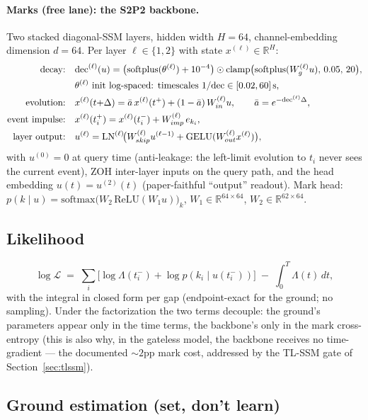\documentclass[11pt]{article}
\begin{document}
\paragraph{Marks (free lane): the S2P2 backbone.} Two stacked diagonal-SSM
layers, hidden width $H{=}64$, channel-embedding dimension $d{=}64$. Per layer
$\ell\in\{1,2\}$ with state $x^{(\ell)}\in\mathbb{R}^{H}$:
\begin{align}
\text{decay:}\quad & \mathrm{dec}^{(\ell)}(u)=\big(\mathrm{softplus}(\theta^{(\ell)})+10^{-4}\big)
\odot \mathrm{clamp}\big(\mathrm{softplus}(W_g^{(\ell)}u),\,0.05,\,20\big),\\
&\theta^{(\ell)} \text{ init log-spaced: timescales } 1/\mathrm{dec} \in [0.02, 60]\,\mathrm{s},\notag\\
\text{evolution:}\quad & x^{(\ell)}(t{+}\Delta)=\bar a\,x^{(\ell)}(t^{+})+(1-\bar a)\,W_{in}^{(\ell)}u,
\qquad \bar a=e^{-\mathrm{dec}^{(\ell)}\Delta},\\
\text{event impulse:}\quad & x^{(\ell)}(t_i^+)=x^{(\ell)}(t_i^-)+W_{imp}^{(\ell)}\,e_{k_i},\\
\text{layer output:}\quad & u^{(\ell)}=\mathrm{LN}^{(\ell)}\!\big(W_{skip}^{(\ell)}u^{(\ell-1)}
+\mathrm{GELU}(W_{out}^{(\ell)}x^{(\ell)})\big),
\end{align}
with $u^{(0)}=0$ at query time (anti-leakage: the left-limit evolution to $t_i$
never sees the current event), ZOH inter-layer inputs on the query path, and
the head embedding $u(t)=u^{(2)}(t)$ (paper-faithful ``output'' readout). Mark
head: $p(k\mid u)=\mathrm{softmax}\big(W_2\,\mathrm{ReLU}(W_1 u)\big)_k$,
$W_1\in\mathbb{R}^{64\times64}$, $W_2\in\mathbb{R}^{62\times64}$.

\subsection{Likelihood}
\begin{equation}
\log\mathcal{L} \;=\; \sum_i\Big[\log\Lambda(t_i^-)+\log p(k_i\mid u(t_i^-))\Big]
\;-\;\int_0^T\!\Lambda(t)\,dt,
\end{equation}
with the integral in closed form per gap (endpoint-exact for the ground; no
sampling). Under the factorization the two terms decouple: the ground's
parameters appear only in the time terms, the backbone's only in the mark
cross-entropy (this is also why, in the gateless model, the backbone receives
no time-gradient --- the documented ${\sim}2$pp mark cost, addressed by the
TL-SSM gate of Section~\ref{sec:tlssm}).

\subsection{Ground estimation (set, don't learn)}
\end{document}
